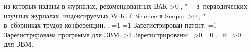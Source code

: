 {\begin{refsection}
         из которых изданы в журналах, рекомендованных ВАК\sloppy%
        \ifnum \value{citeauthorscopuswos}>0%
            ,  "--- в~периодических научных журналах, индексируемых Web of~Science и Scopus\sloppy%
        \fi%
        \ifnum \value{citeauthorconf}>0%
            ,  "--- в~сборниках трудов конференции.
        \else%
            .
        \fi%
        \ifnum \value{citeregistered}=1%
            \ifnum \value{citeauthorpatent}=1%
                Зарегистрирован  патент.
            \fi%
            \ifnum \value{citeauthorprogram}=1%
                Зарегистрирована  программа для ЭВМ.
            \fi%
        \fi%
        \ifnum \value{citeregistered}>1%
            Зарегистрированы\ %
            \ifnum \value{citeauthorpatent}>0%
            \sloppy%
            \ifnum \value{citeauthorprogram}=0 . \else \ и~\fi%
            \fi%
            \ifnum \value{citeauthorprogram}>0%
             для ЭВМ.
            \fi%
        \fi%
    \end{refsection}%
    \begin{refsection}
        \nocite{vakbib2}%
        \nocite{bib1}%
        \nocite{confbib1}%
    \end{refsection}%
}


